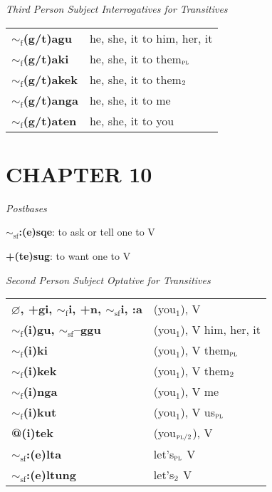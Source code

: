 \documentclass{article}
\begin{document}
\bigskip

\textit{Third Person Subject Interrogatives for Transitives}

\begin{tabular}{ l l }
\textbf{$\sim_\text{f}$(g/t)agu} & he, she, it to him, her, it\\
\textbf{$\sim_\text{f}$(g/t)aki} & he, she, it to them$_\text{\textsc{pl}}$ \\
\textbf{$\sim_\text{f}$(g/t)akek} & he, she, it to them$_\text{\textsc{2}}$ \\
\textbf{$\sim_\text{f}$(g/t)anga} & he, she, it to me \\
\textbf{$\sim_\text{f}$(g/t)aten} & he, she, it to you
\end{tabular}

\section{CHAPTER 10}

\textit{Postbases}
\begin{description}
\item \textbf{$\sim_\text{sf}$:(e)sqe}: to ask or tell one to V
\item \textbf{+(te)sug}: to want one to V
\end{description}

\bigskip

\textit{Second Person Subject Optative for Transitives}

\begin{tabular}{ l l }
\textbf{$\varnothing$, +gi, $\sim_\text{f}$i, +n, $\sim_\text{sf}$i, :a} & (you$_1$), V \\
\textbf{$\sim_\text{f}$(i)gu, $\sim_\text{sf}$--ggu} & (you$_1$), V him, her, it \\
\textbf{$\sim_\text{f}$(i)ki} & (you$_1$), V them$_\text{\textsc{pl}}$ \\
\textbf{$\sim_\text{f}$(i)kek} & (you$_1$), V them$_\text{\textsc{2}}$ \\
\textbf{$\sim_\text{f}$(i)nga} & (you$_1$), V me \\
\textbf{$\sim_\text{f}$(i)kut} & (you$_1$), V us$_\text{\textsc{pl}}$ \\
\textbf{@(i)tek} & (you$_\text{\textsc{pl/2}}$), V \\
\textbf{$\sim_\text{sf}$:(e)lta} & let's$_\text{\textsc{pl}}$ V \\
\textbf{$\sim_\text{sf}$:(e)ltung} & let's$_\text{\textsc{2}}$ V
\end{tabular}
\end{document}
